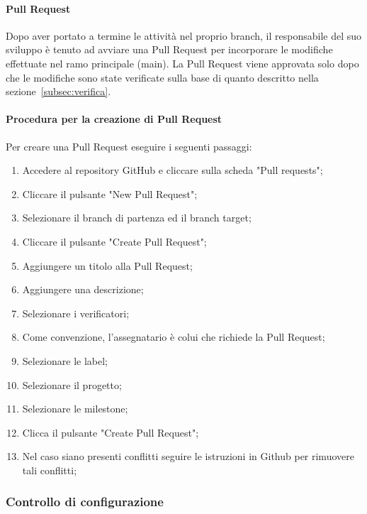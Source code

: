 \paragraph{Pull Request}
Dopo aver portato a termine le attività nel proprio branch, il responsabile del suo sviluppo è tenuto ad avviare una Pull Request per incorporare le modifiche effettuate nel ramo principale (main). La Pull Request viene approvata solo dopo che le modifiche sono state verificate sulla base di quanto descritto nella sezione~\ref{subsec:verifica}.

\hypertarget{par:creazionePR}{\paragraph*{Procedura per la creazione di Pull Request}}
Per creare una Pull Request eseguire i seguenti passaggi:
\begin{enumerate}
    \item Accedere al repository GitHub e cliccare sulla scheda "Pull requests";
    \item Cliccare il pulsante "New Pull Request";
    \item Selezionare il branch di partenza ed il branch target;
    \item Cliccare il pulsante "Create Pull Request";
    \item Aggiungere un titolo alla Pull Request;
    \item Aggiungere una descrizione;
    \item Selezionare i verificatori;
    \item Come convenzione, l'assegnatario è colui che richiede la Pull Request;
    \item Selezionare le label;
    \item Selezionare il progetto;
    \item Selezionare le milestone;
    \item Clicca il pulsante "Create Pull Request";
    \item Nel caso siano presenti conflitti seguire le istruzioni in Github per rimuovere tali conflitti;
\end{enumerate}

\subsubsection{Controllo di configurazione}
